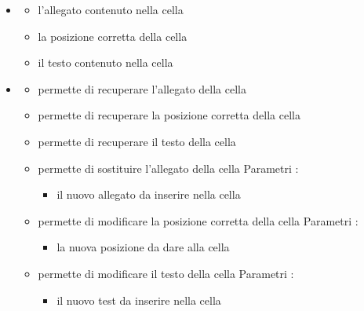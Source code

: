 \begin{itemize}
\item {}
\begin{itemize}
\item {}
\newline
l'allegato contenuto nella cella
\item {}
\newline
la posizione corretta della cella
\item {}
\newline
il testo contenuto nella cella
\end{itemize}
\item {}
\begin{itemize}
\item {}
\newline
permette di recuperare l'allegato della cella
\newline
\item {}
\newline
permette di recuperare la posizione corretta della cella
\newline
\item {}
\newline
permette di recuperare il testo della cella
\newline
\item {}
\newline
permette di sostituire l'allegato della cella
\newline
Parametri :
\begin{itemize}
\item {}
\newline
il nuovo allegato da inserire nella cella
\end{itemize}
\item {}
\newline
permette di modificare la posizione corretta della cella
\newline
Parametri :
\begin{itemize}
\item {}
\newline
la nuova posizione da dare alla cella
\end{itemize}
\item {}
\newline
permette di modificare il testo della cella
\newline
Parametri :
\begin{itemize}
\item {}
\newline
il nuovo test da inserire nella cella
\end{itemize}
\end{itemize}
\end{itemize}
